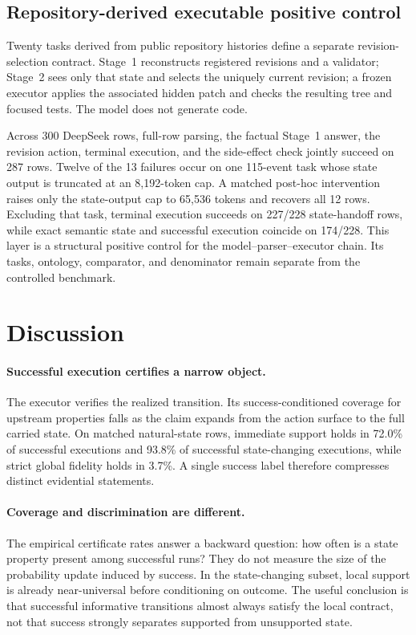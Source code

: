 \documentclass[11pt]{article}
\begin{document}
\subsection{Repository-derived executable positive control}

Twenty tasks derived from public repository histories define a separate revision-selection contract. Stage~1 reconstructs registered revisions and a validator; Stage~2 sees only that state and selects the uniquely current revision; a frozen executor applies the associated hidden patch and checks the resulting tree and focused tests. The model does not generate code.

Across 300 DeepSeek rows, full-row parsing, the factual Stage~1 answer, the revision action, terminal execution, and the side-effect check jointly succeed on 287 rows. Twelve of the 13 failures occur on one 115-event task whose state output is truncated at an 8,192-token cap. A matched post-hoc intervention raises only the state-output cap to 65,536 tokens and recovers all 12 rows. Excluding that task, terminal execution succeeds on 227/228 state-handoff rows, while exact semantic state and successful execution coincide on 174/228. This layer is a structural positive control for the model--parser--executor chain. Its tasks, ontology, comparator, and denominator remain separate from the controlled benchmark.

\section{Discussion}
\label{sec:discussion}

\paragraph{Successful execution certifies a narrow object.}
The executor verifies the realized transition. Its success-conditioned coverage for upstream properties falls as the claim expands from the action surface to the full carried state. On matched natural-state rows, immediate support holds in 72.0\% of successful executions and 93.8\% of successful state-changing executions, while strict global fidelity holds in 3.7\%. A single success label therefore compresses distinct evidential statements.

\paragraph{Coverage and discrimination are different.}
The empirical certificate rates answer a backward question: how often is a state property present among successful runs? They do not measure the size of the probability update induced by success. In the state-changing subset, local support is already near-universal before conditioning on outcome. The useful conclusion is that successful informative transitions almost always satisfy the local contract, not that success strongly separates supported from unsupported state.
\end{document}
